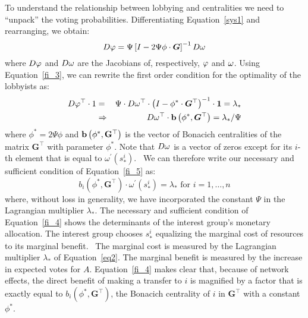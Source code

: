 \documentclass[nojss]{jss}
\begin{document}
To understand the relationship between lobbying and centralities we need to
``unpack'' the voting probabilities.
Differentiating Equation~\ref{sys1} and rearranging, we obtain:
%
\begin{equation}
D{\bf \varphi}=\Psi \left[ I-2\Psi \phi \cdot \boldsymbol{G}\right] ^{-1}D{\bf \omega}
\label{fi_3}
\end{equation}%
%
where $D{\bf \varphi}$ and $D{\bf \omega}$ are the Jacobians of,
respectively, ${\bf \varphi }$ and ${\bf \omega}$. Using Equation~\ref{fi_3}, we
can rewrite the first order condition for the optimality of the lobbyists as:%
%
\begin{eqnarray}
D{\bf \varphi }^{\top}\cdot 1 &=&\Psi \cdot D{\bf \omega }^{\top}\cdot \left(
I-\phi ^{\ast }\cdot \boldsymbol{G}^{\top}\right) ^{-1}\cdot {\bf 1}=\lambda _{\ast }
\label{fi_5} \\
&\Rightarrow &D{\bf \omega }^{\top}\cdot {\bf b}\left( {\bf \phi }^{\ast
},\boldsymbol{G}^{\top}\right) =\lambda _{\ast }/\Psi   \nonumber
\end{eqnarray}
%
where $\phi ^{\ast }=2\Psi \phi $ and ${\bf b}\left( {\bf \phi }^{\ast },%
{\bf G}^{\top}\right) $ is the vector of Bonacich centralities of the matrix $%
\boldsymbol{G}^{\top}$ with parameter $\phi ^{\ast }$.  Note that $D{\bf
\omega}$ is a vector of zeros except for its $i$-th element that is equal to
$\omega ^{\prime}(s_{\ast }^{i})$.  \ We can therefore write our necessary
and sufficient condition of Equation~\ref{fi_5} as:
%
\begin{equation}
b_{i}\left( \phi ^{\ast },\boldsymbol{G}^{\top}\right) \cdot \omega ^{\prime }(s_{\ast
}^{i})=\lambda _{\ast }\text{ for }i=1,\dots,n  \label{fi_4}
\end{equation}%
%
where, without loss in generality, we have incorporated the constant $\Psi$
in the Lagrangian multiplier $\lambda _{\ast}$. The necessary and
sufficient condition of Equation~\ref{fi_4} shows the determinants of the interest
group's monetary allocation. The interest group chooses $s_{\ast}^{i}$
equalizing the marginal cost of resources to its marginal benefit. \ The
marginal cost is measured by the Lagrangian multiplier $\lambda_{\ast}$ of
Equation~\ref{eq2}.  The marginal benefit is measured by the increase in expected
votes for $A$.  Equation~\ref{fi_4} makes clear that, because of network
effects, the direct benefit of making a transfer to $i$ is magnified by a
factor that is exactly equal to $b_{i}\left(\phi
^{\ast},\boldsymbol{G}^{\top}\right) $, the Bonacich centrality of $i$ in
$\boldsymbol{G}^{\top}$ with a constant $\phi ^{\ast}$.
\end{document}
